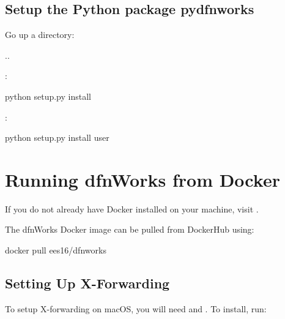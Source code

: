 \documentclass[letterpaper,10pt,english]{sphinxmanual}
\begin{document}
\section{Setup the Python package pydfnworks}
\label{\detokenize{setup:setup-the-python-package-pydfnworks}}
Go up a directory:

%
\begin{sphinxVerbatim}[commandchars=\\\{\}]
\PYGZdl{}  ..
\end{sphinxVerbatim}

:

%
\begin{sphinxVerbatim}[commandchars=\\\{\}]
\PYGZdl{} python setup.py install
\end{sphinxVerbatim}

:

%
\begin{sphinxVerbatim}[commandchars=\\\{\}]
\PYGZdl{} python setup.py install \PYGZhy{}\PYGZhy{}user
\end{sphinxVerbatim}


\chapter{Running dfnWorks from Docker}
\label{\detokenize{setup:running-dfnworks-from-docker}}
If you do not already have Docker installed on your machine,
visit .

The dfnWorks Docker image can be pulled from DockerHub using:

%
\begin{sphinxVerbatim}[commandchars=\\\{\}]
\PYGZdl{} docker pull ees16/dfnworks
\end{sphinxVerbatim}


\section{Setting Up X-Forwarding}
\label{\detokenize{setup:setting-up-x-forwarding}}

To setup X-forwarding on macOS, you will need  and .
To install, run:
\end{document}
